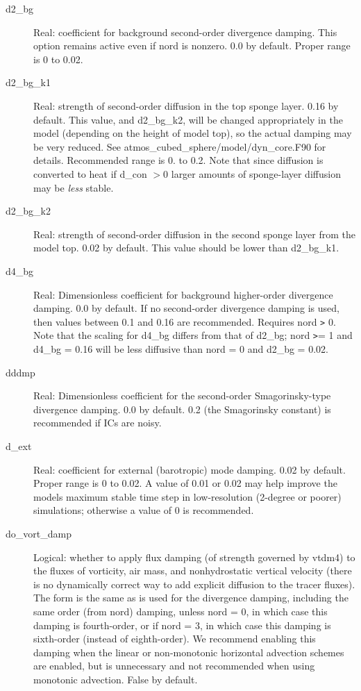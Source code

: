 \documentclass[12pt,letterpaper]{book}
\begin{document}
\begin{description}

\item[d2\_bg] Real: coefficient for background second-order divergence damping. This option remains active even if nord is nonzero. 0.0 by default. Proper range is 
0 to 0.02. 


\item[d2\_bg\_k1] Real: strength of second-order diffusion in the top sponge layer. 0.16 by default. This value, and d2\_bg\_k2, will be changed appropriately in the model 
(depending on the height of model top), so the actual damping may be very reduced. See atmos\_cubed\_sphere/model/dyn\_core.F90 for details. Recommended range is 0. to 0.2. Note that since diffusion is converted to heat if d\_con $> 0$ larger amounts of sponge-layer diffusion may be \textit{less} stable.


\item[d2\_bg\_k2] Real: strength of second-order diffusion in the second sponge layer from the model top. 0.02 by default. This value should be lower than d2\_bg\_k1.


\item[d4\_bg] Real: Dimensionless coefficient for background higher-order divergence damping. 
0.0 by default. If no second-order divergence damping is used, then values between 
0.1 and 0.16 are recommended. Requires nord \texttt{>} 0. Note that the scaling for d4\_bg differs from that of d2\_bg; nord 
\texttt{>}= 1 and d4\_bg = 0.16 will be less diffusive than nord = 0 and d2\_bg 
= 0.02.


\item[dddmp] Real: Dimensionless coefficient for the second-order Smagorinsky-type divergence damping. 
0.0 by default. 0.2 (the Smagorinsky constant) is recommended if ICs are noisy.


\item[d\_ext] Real: coefficient for external (barotropic) mode damping. 
0.02 by default. Proper range is 0 to 0.02. A value of 0.01 or 0.02 may help improve the models maximum stable time step in low-resolution 
(2-degree or poorer) simulations; otherwise a value of 0 is recommended.


\item[do\_vort\_damp] Logical: whether to apply flux damping (of strength governed by vtdm4) to the fluxes of vorticity, air mass, and nonhydrostatic vertical velocity (there is no dynamically correct way to add explicit diffusion to the tracer fluxes). The form is the same as is used for the divergence damping, including the same order 
(from nord) damping, unless nord = 0, in which case this damping is fourth-order, or if nord = 3, in which case this damping is sixth-order (instead of eighth-order). We recommend enabling this damping when the 
linear or non-monotonic horizontal advection schemes are enabled, but is unnecessary and not recommended when using monotonic advection. False by default. 



\end{description}
\end{document}
